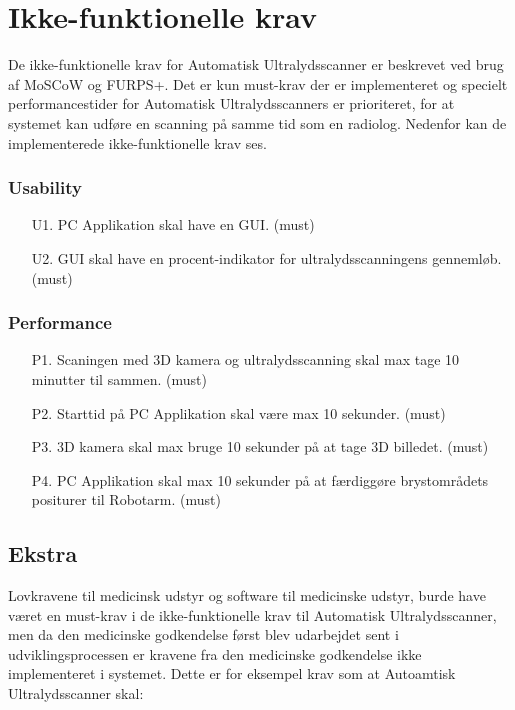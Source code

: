 \section{Ikke-funktionelle krav}
De ikke-funktionelle krav for Automatisk Ultralydsscanner er beskrevet ved brug af MoSCoW og FURPS+. Det er kun must-krav der er implementeret og specielt performancestider for Automatisk Ultralydsscanners er prioriteret, for at systemet kan udføre en scanning på samme tid som en radiolog. Nedenfor kan de implementerede ikke-funktionelle krav ses. 

\subsubsection{Usability}
\begin{itemize}
    \item [U1.] PC Applikation skal have en GUI. (must)
     \item[U2.] GUI skal have en procent-indikator for ultralydsscanningens gennemløb. (must)
\end{itemize}

\subsubsection{Performance}
\begin{itemize}
    \item[P1.] Scaningen med 3D kamera og ultralydsscanning skal max tage 10 minutter til sammen. (must) 
    \item[P2.] Starttid på PC Applikation skal være max 10 sekunder. (must)
    \item[P3.] 3D kamera skal max bruge 10 sekunder på at tage 3D billedet. (must)
    \item[P4.] PC Applikation skal max 10 sekunder på at færdiggøre brystområdets positurer til Robotarm. (must)
\end{itemize}

\subsection{Ekstra}
Lovkravene til medicinsk udstyr og software til medicinske udstyr, burde have været en must-krav i de ikke-funktionelle krav til Automatisk Ultralydsscanner, men da den medicinske godkendelse først blev udarbejdet sent i udviklingsprocessen er kravene fra den medicinske godkendelse ikke implementeret i systemet. Dette er for eksempel krav som at Autoamtisk Ultralydsscanner skal: 

